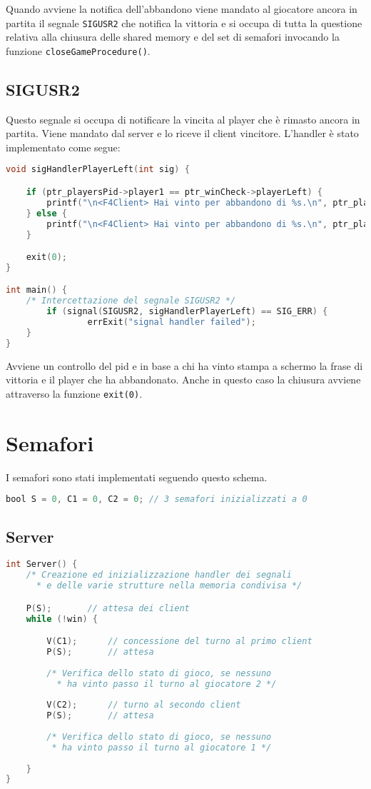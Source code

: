 \documentclass[a4paper,11pt]{article}
\begin{document}
Quando avviene la notifica dell’abbandono viene mandato al giocatore ancora in partita il segnale \texttt{SIGUSR2} che notifica la vittoria e si occupa di tutta la questione relativa alla chiusura delle shared memory e del set di semafori invocando la funzione \texttt{closeGameProcedure()}.

\subsection{SIGUSR2}

Questo segnale si occupa di notificare la vincita al player che \`e rimasto ancora in partita. Viene mandato dal server e lo riceve il client vincitore. L'handler \`e stato implementato come segue:
\begin{lstlisting}[language=C]
void sigHandlerPlayerLeft(int sig) {

    if (ptr_playersPid->player1 == ptr_winCheck->playerLeft) {
        printf("\n<F4Client> Hai vinto per abbandono di %s.\n", ptr_playersPid->player1Name);
    } else {
        printf("\n<F4Client> Hai vinto per abbandono di %s.\n", ptr_playersPid->player2Name);
    }

    exit(0);
}

int main() {
	/* Intercettazione del segnale SIGUSR2 */
    	if (signal(SIGUSR2, sigHandlerPlayerLeft) == SIG_ERR) {
        		errExit("signal handler failed");
    }
}

\end{lstlisting}
Avviene un controllo del pid e in base a chi ha vinto stampa a schermo la frase di vittoria e il player che ha abbandonato. Anche in questo caso la chiusura avviene attraverso la funzione \texttt{exit(0)}. 
\newpage
\section{Semafori}

I semafori sono stati implementati seguendo questo schema.
\begin{lstlisting}[language=C]
bool S = 0, C1 = 0, C2 = 0;	// 3 semafori inizializzati a 0
\end{lstlisting}
\subsection*{Server}
\begin{lstlisting}[language=C]
int Server() {
	/* Creazione ed inizializzazione handler dei segnali
	  * e delle varie strutture nella memoria condivisa */

	P(S); 		// attesa dei client
	while (!win) {

		V(C1); 		// concessione del turno al primo client
		P(S);		// attesa
	
		/* Verifica dello stato di gioco, se nessuno 
		  * ha vinto passo il turno al giocatore 2 */
	
		V(C2);		// turno al secondo client
		P(S);		// attesa
		
		/* Verifica dello stato di gioco, se nessuno
		 * ha vinto passo il turno al giocatore 1 */		
	
	}
}
\end{lstlisting}
\end{document}
